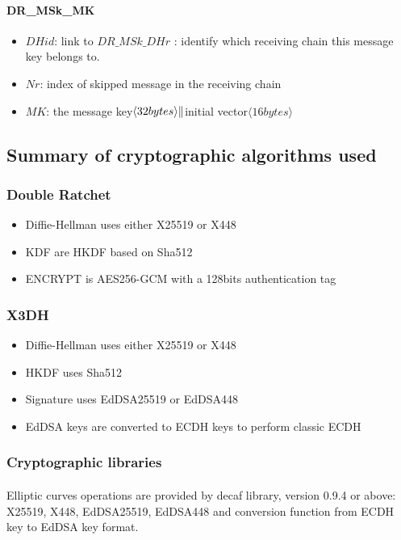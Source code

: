 \documentclass[a4paper,11pt]{article}
\begin{document}
    \paragraph*{DR\_MSk\_MK}
    \begin{itemize}
      \item $DHid$: link to $DR\_MSk\_DHr$ : identify which receiving chain this message key belongs to.
      \item $Nr$: index of skipped message in the receiving chain
      \item $MK$: the message key$\langle 32bytes\rangle  \Arrowvert $initial vector$\langle 16bytes\rangle $
    \end{itemize}
  

    
  \subsection{Summary of cryptographic algorithms used}
    \subsubsection{Double Ratchet}
      \begin{itemize}
        \item Diffie-Hellman uses either X25519 or X448
        \item KDF are HKDF\cite{rfc5869} based on Sha512
        \item ENCRYPT is AES256-GCM with a 128bits authentication tag
      \end{itemize}
    \subsubsection{X3DH}
      \begin{itemize}
        \item Diffie-Hellman uses either X25519 or X448
        \item HKDF uses Sha512
        \item Signature uses EdDSA25519 or EdDSA448
        \item EdDSA keys are converted to ECDH keys to perform classic ECDH
      \end{itemize}
  
  \subsubsection{Cryptographic libraries}
    \paragraph{}Elliptic curves operations are provided by decaf library\cite{libdecaf}, version 0.9.4 or above: X25519, X448, EdDSA25519, EdDSA448 and conversion function from ECDH key to EdDSA key format.
\end{document}
